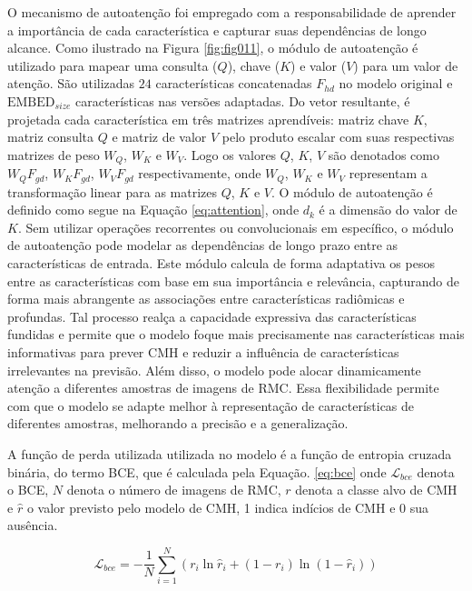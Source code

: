 O mecanismo de autoatenção foi empregado com a responsabilidade de aprender a importância de cada característica e capturar suas dependências de longo alcance. Como ilustrado na Figura \ref{fig:fig011}, o módulo de autoatenção é utilizado para mapear uma consulta ($Q$), chave ($K$) e valor ($V$) para um valor de atenção. São utilizadas $24$ características concatenadas $F_{hd}$ no modelo original e $\text{EMBED}_{size}$ características nas versões adaptadas. Do vetor resultante, é projetada cada característica em três matrizes aprendíveis: matriz chave $K$, matriz consulta $Q$ e matriz de valor $V$ pelo produto escalar com suas respectivas matrizes de peso $W_{Q}$, $W_{K}$ e $W_{V}$. Logo os valores $Q$, $K$, $V$ são denotados como $W_{Q}F_{gd}$, $W_{K}F_{gd}$, $W_{V}F_{gd}$ respectivamente, onde $W_{Q}$, $W_{K}$ e $W_{V}$ representam a transformação linear para as matrizes $Q$, $K$ e $V$. O módulo de autoatenção é definido como segue na Equação \ref{eq:attention}, onde $d_{k}$ é a dimensão do valor de $K$. Sem utilizar operações recorrentes ou convolucionais em específico, o módulo de autoatenção pode modelar as dependências de longo prazo entre as características de entrada.
Este módulo calcula de forma adaptativa os pesos entre as características com base em sua importância e relevância, capturando de forma mais abrangente as associações entre características radiômicas e profundas. Tal processo realça a capacidade expressiva das características fundidas e permite que o modelo foque mais precisamente nas características mais informativas para prever \gls{CMH} e reduzir a influência de características irrelevantes na previsão. Além disso, o modelo pode alocar dinamicamente atenção a diferentes amostras de imagens de \gls{RMC}. Essa flexibilidade permite com que o modelo se adapte melhor à representação de características de diferentes amostras, melhorando a precisão e a generalização.

A função de perda utilizada utilizada no modelo é a função de entropia cruzada binária, do termo  \gls{BCE}, que é calculada pela Equação. \ref{eq:bce} onde $\mathcal{L}_{bce}$ denota o \gls{BCE}, $N$ denota o número de imagens de \gls{RMC}, $r$ denota a classe alvo de \gls{CMH} e $\hat{r}$ o valor previsto pelo modelo de \gls{CMH}, 1 indica indícios de \gls{CMH} e 0 sua ausência.

\begin{equation}
\mathcal{L}_{bce} = -\frac{1}{N} \sum_{i=1}^N
(r_i \ln \hat{r}_i + (1 - r_i) \ln (1 - \hat{r}_i))
\label{eq:bce}
\end{equation}

